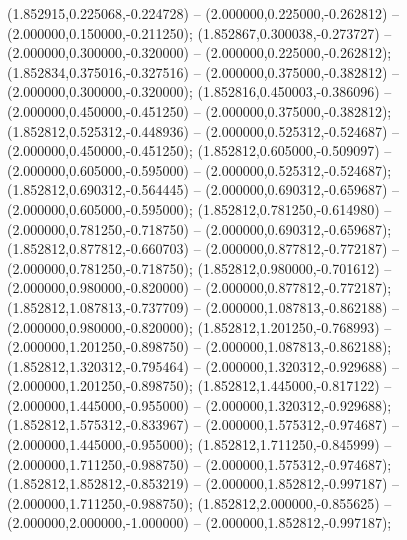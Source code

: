  (1.852915,0.225068,-0.224728) -- (2.000000,0.225000,-0.262812) -- (2.000000,0.150000,-0.211250);
 (1.852867,0.300038,-0.273727) -- (2.000000,0.300000,-0.320000) -- (2.000000,0.225000,-0.262812);
 (1.852834,0.375016,-0.327516) -- (2.000000,0.375000,-0.382812) -- (2.000000,0.300000,-0.320000);
 (1.852816,0.450003,-0.386096) -- (2.000000,0.450000,-0.451250) -- (2.000000,0.375000,-0.382812);
 (1.852812,0.525312,-0.448936) -- (2.000000,0.525312,-0.524687) -- (2.000000,0.450000,-0.451250);
 (1.852812,0.605000,-0.509097) -- (2.000000,0.605000,-0.595000) -- (2.000000,0.525312,-0.524687);
 (1.852812,0.690312,-0.564445) -- (2.000000,0.690312,-0.659687) -- (2.000000,0.605000,-0.595000);
 (1.852812,0.781250,-0.614980) -- (2.000000,0.781250,-0.718750) -- (2.000000,0.690312,-0.659687);
 (1.852812,0.877812,-0.660703) -- (2.000000,0.877812,-0.772187) -- (2.000000,0.781250,-0.718750);
 (1.852812,0.980000,-0.701612) -- (2.000000,0.980000,-0.820000) -- (2.000000,0.877812,-0.772187);
 (1.852812,1.087813,-0.737709) -- (2.000000,1.087813,-0.862188) -- (2.000000,0.980000,-0.820000);
 (1.852812,1.201250,-0.768993) -- (2.000000,1.201250,-0.898750) -- (2.000000,1.087813,-0.862188);
 (1.852812,1.320312,-0.795464) -- (2.000000,1.320312,-0.929688) -- (2.000000,1.201250,-0.898750);
 (1.852812,1.445000,-0.817122) -- (2.000000,1.445000,-0.955000) -- (2.000000,1.320312,-0.929688);
 (1.852812,1.575312,-0.833967) -- (2.000000,1.575312,-0.974687) -- (2.000000,1.445000,-0.955000);
 (1.852812,1.711250,-0.845999) -- (2.000000,1.711250,-0.988750) -- (2.000000,1.575312,-0.974687);
 (1.852812,1.852812,-0.853219) -- (2.000000,1.852812,-0.997187) -- (2.000000,1.711250,-0.988750);
 (1.852812,2.000000,-0.855625) -- (2.000000,2.000000,-1.000000) -- (2.000000,1.852812,-0.997187);
